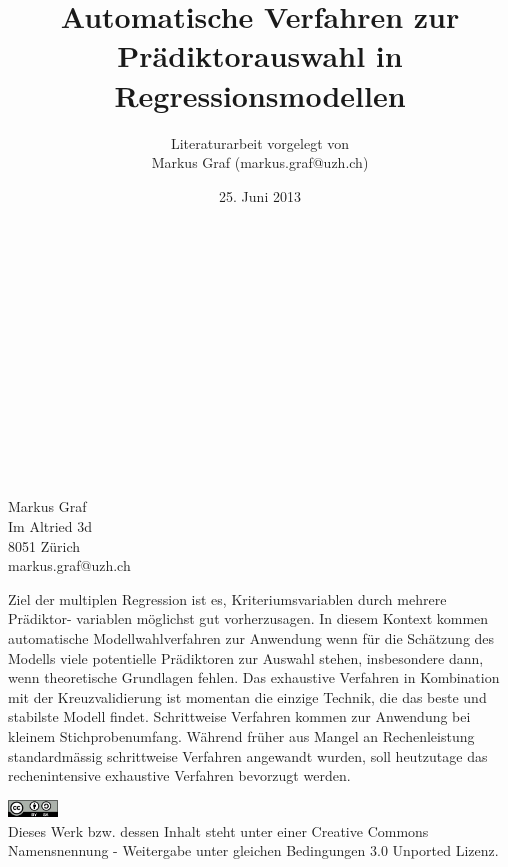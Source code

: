 \documentclass[german,12pt,doc]{apa}
\begin{document}
\begin{titlepage}

\title{Automatische Verfahren zur Prädiktorauswahl in Regressionsmodellen}
\author{Literaturarbeit vorgelegt von \\ Markus Graf (markus.graf@uzh.ch)}
\date{25. Juni 2013}

\maketitle
\\
\\
\\
\\
\\
\\
\\
\\
\\
\\
\\
\\
Markus Graf\\
Im Altried 3d\\
8051 Zürich\\
markus.graf@uzh.ch
\end{titlepage}
\thispagestyle{empty}
Ziel der multiplen Regression ist es, Kriteriumsvariablen durch mehrere Prädiktor- variablen möglichst gut vorherzusagen. In diesem Kontext kommen automatische Modellwahlverfahren zur Anwendung wenn für die Schätzung des Modells viele potentielle Prädiktoren zur Auswahl stehen, insbesondere dann, wenn theoretische Grundlagen fehlen. Das exhaustive Verfahren in Kombination mit der Kreuzvalidierung ist momentan die einzige Technik, die das beste und stabilste Modell findet. Schrittweise Verfahren kommen zur Anwendung bei kleinem Stichprobenumfang. Während früher aus Mangel an Rechenleistung standardmässig schrittweise Verfahren angewandt wurden, soll heutzutage das rechenintensive exhaustive Verfahren bevorzugt werden.

\begin{center}
\includegraphics[width=0.1\textwidth]{cc_by_sa.jpg}\\
Dieses Werk bzw. dessen Inhalt steht unter einer Creative Commons Namensnennung - Weitergabe unter gleichen Bedingungen 3.0 Unported Lizenz.
\end{center}
\setlength{\parindent}{0pt}
\newpage
\thispagestyle{empty}
\begin{spacing}{0.01}
\tableofcontents
\end{spacing}
\newpage
\end{document}

